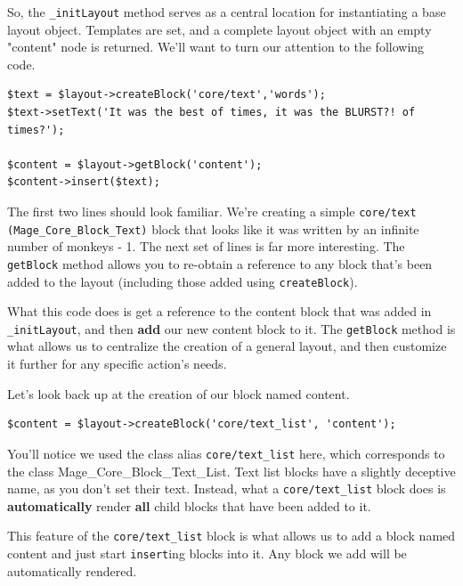 \documentclass[oneside]{book}
\begin{document}
So, the \footnotesize\texttt{\_initLayout} \normalsize  method serves as a central location for instantiating a base layout object.  Templates are set, and a complete layout object with an empty "content" node is returned.  We'll want to turn our attention to the following code.

\begin{lstlisting}
$text = $layout->createBlock('core/text','words');
$text->setText('It was the best of times, it was the BLURST?! of times?');

$content = $layout->getBlock('content');
$content->insert($text);

\end{lstlisting}


The first two lines should look familiar.  We're creating a simple \footnotesize\texttt{core/text (Mage\_Core\_Block\_Text)} \normalsize  block that looks like it was written by an infinite number of monkeys - 1.  The next set of lines is far more interesting.  The \footnotesize\texttt{getBlock} \normalsize  method allows you to re-obtain a reference to any block that's been added to the layout (including those added using \footnotesize\texttt{createBlock}\normalsize).

What this code does is get a reference to the content block that was added in \footnotesize\texttt{\_initLayout}\normalsize, and then \textbf{add} our new content block to it.  The \footnotesize\texttt{getBlock} \normalsize  method is what allows us to centralize the creation of a general layout, and then customize it further for any specific action's needs.

Let's look back up at the creation of our block named content.

\begin{lstlisting}
$content = $layout->createBlock('core/text_list', 'content');

\end{lstlisting}


You'll notice we used the class alias \footnotesize\texttt{core/text\_list} \normalsize  here, which corresponds to the class Mage\_Core\_Block\_Text\_List.  Text list blocks have a slightly deceptive name, as you don't set their text.  Instead, what a \footnotesize\texttt{core/text\_list} \normalsize  block does is \textbf{automatically} render \textbf{all} child blocks that have been added to it.

This feature of the \footnotesize\texttt{core/text\_list} \normalsize  block is what allows us to add a block named content and just start \footnotesize\texttt{insert}\normalsize ing blocks into it.  Any block we add will be automatically rendered.
\end{document}
